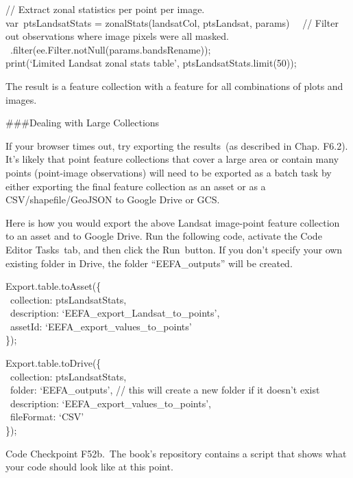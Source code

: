 \documentclass[
  letterpaper,
  DIV=11,
  numbers=noendperiod]{scrreprt}
\begin{document}
// Extract zonal statistics per point per image.\\
var~ptsLandsatStats = zonalStats(landsatCol, ptsLandsat, params)~ ~//
Filter out observations where image pixels were all masked.~
~.filter(ee.Filter.notNull(params.bandsRename));\\
print(`Limited Landsat zonal stats table', ptsLandsatStats.limit(50));

The result is a feature collection with a feature for all combinations
of plots and images.

\#\#\#Dealing with Large Collections

If your browser times out, try exporting the results~(as described in
Chap. F6.2). It's likely that point feature collections that cover a
large area or contain many points (point-image observations) will need
to be exported as a batch task by either exporting the final feature
collection as an asset or as a CSV/shapefile/GeoJSON to Google Drive or
GCS.

Here is how you would export the above Landsat image-point feature
collection to an asset and to Google Drive. Run the following code,
activate the Code Editor Tasks~tab, and then click the Run~button. If
you don't specify your own existing folder in Drive, the folder
``EEFA\_outputs'' will be created.

Export.table.toAsset(\{\\
\hspace*{0.333em} ~collection: ptsLandsatStats,\\
\hspace*{0.333em} ~description: `EEFA\_export\_Landsat\_to\_points',\\
\hspace*{0.333em} ~assetId: `EEFA\_export\_values\_to\_points'\\
\});

Export.table.toDrive(\{\\
\hspace*{0.333em} ~collection: ptsLandsatStats,\\
\hspace*{0.333em} ~folder: `EEFA\_outputs', // this will create a new
folder if it doesn't exist~ ~description:
`EEFA\_export\_values\_to\_points',\\
\hspace*{0.333em} ~fileFormat: `CSV'\\
\});

\begin{tcolorbox}[enhanced jigsaw, left=2mm, breakable, rightrule=.15mm, opacityback=0, colframe=quarto-callout-note-color-frame, colbacktitle=quarto-callout-note-color!10!white, arc=.35mm, opacitybacktitle=0.6, toptitle=1mm, colback=white, leftrule=.75mm, title=\textcolor{quarto-callout-note-color}{\faInfo}\hspace{0.5em}{Note}, toprule=.15mm, bottomtitle=1mm, titlerule=0mm, bottomrule=.15mm, coltitle=black]

Code Checkpoint F52b.~The book's repository contains a script that shows
what your code should look like at this point.

\end{tcolorbox}
\end{document}
